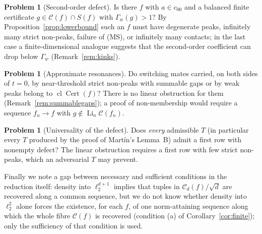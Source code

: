 \documentclass[10pt]{amsart}
\theoremstyle{definition}
\newtheorem{problem}[theorem]{Problem}
\theoremstyle{remark}
\newcommand{\Cset}{\mathcal C}
\newcommand{\Cert}{\operatorname{Cert}}
\newcommand{\Li}{\operatorname*{Li}}
\newcommand{\cl}{\operatorname{cl}}
\begin{document}
\begin{problem}[Second-order defect]\label{prob:secondorder}
Is there $f$ with $a\in c_{00}$ and a balanced finite certificate
$g\in\Cset(f)\cap S(f)$ with $\Gamma_w(g)>1$?  By
Proposition~\ref{prop:lowerbound} such an $f$ must have degenerate peaks,
infinitely many strict non-peaks, failure of (MS), or infinitely many
contacts; in the last case a finite-dimensional analogue suggests that the
second-order coefficient can drop below $\Gamma_w$ (Remark~\ref{rem:kinks}).
\end{problem}

\begin{problem}[Approximate resonances]\label{prob:approx}
Do switching mates carried, on both sides of $t=0$, by near-threshold
strict non-peaks with summable gaps or by weak peaks belong to
$\cl\Cert(f)$?  There is no linear obstruction for them
(Remark~\ref{rem:summablegaps}); a proof of non-membership would require a
sequence $f_n\to f$ with $g\notin\Li_n\Cset(f_n)$.
\end{problem}

\begin{problem}[Universality of the defect]\label{prob:universal}
Does \emph{every} admissible $T$ (in particular every $T$ produced by the
proof of Mart\'in's Lemma~B) admit a first row with nonempty defect?  The
linear obstruction requires a first row with few strict non-peaks, which an
adversarial $T$ may prevent.
\end{problem}

Finally we note a gap between necessary and sufficient conditions in the
reduction itself: density into $\ell_2^{d+1}$ implies that tuples in
$\Cset_d(f)/\sqrt d$ are recovered along a common sequence, but we do not
know whether density into $\ell_2^2$ alone forces the existence, for each
$f$, of one norm-attaining sequence along which the whole fibre $\Cset(f)$ is
recovered (condition (a) of Corollary~\ref{cor:finite}); only the
sufficiency of that condition is used.
\end{document}

